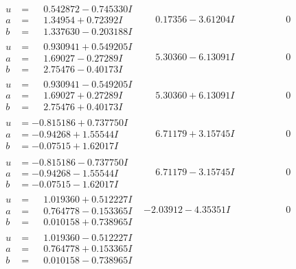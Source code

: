 \documentclass[1p]{elsarticle_modified}
\theoremstyle{definition}
\begin{document}
$$\begin{array}{c|c|c}
\begin{aligned}
u &= \phantom{-}0.542872 - 0.745330 I \\
a &= \phantom{-}1.34954 + 0.72392 I \\
b &= \phantom{-}1.337630 - 0.203188 I\end{aligned}
 & \phantom{-}0.17356 - 3.61204 I & \phantom{-0.000000 } 0 \\ \hline\begin{aligned}
u &= \phantom{-}0.930941 + 0.549205 I \\
a &= \phantom{-}1.69027 - 0.27289 I \\
b &= \phantom{-}2.75476 - 0.40173 I\end{aligned}
 & \phantom{-}5.30360 - 6.13091 I & \phantom{-0.000000 } 0 \\ \hline\begin{aligned}
u &= \phantom{-}0.930941 - 0.549205 I \\
a &= \phantom{-}1.69027 + 0.27289 I \\
b &= \phantom{-}2.75476 + 0.40173 I\end{aligned}
 & \phantom{-}5.30360 + 6.13091 I & \phantom{-0.000000 } 0 \\ \hline\begin{aligned}
u &= -0.815186 + 0.737750 I \\
a &= -0.94268 + 1.55544 I \\
b &= -0.07515 + 1.62017 I\end{aligned}
 & \phantom{-}6.71179 + 3.15745 I & \phantom{-0.000000 } 0 \\ \hline\begin{aligned}
u &= -0.815186 - 0.737750 I \\
a &= -0.94268 - 1.55544 I \\
b &= -0.07515 - 1.62017 I\end{aligned}
 & \phantom{-}6.71179 - 3.15745 I & \phantom{-0.000000 } 0 \\ \hline\begin{aligned}
u &= \phantom{-}1.019360 + 0.512227 I \\
a &= \phantom{-}0.764778 - 0.153365 I \\
b &= \phantom{-}0.010158 + 0.738965 I\end{aligned}
 & -2.03912 - 4.35351 I & \phantom{-0.000000 } 0 \\ \hline\begin{aligned}
u &= \phantom{-}1.019360 - 0.512227 I \\
a &= \phantom{-}0.764778 + 0.153365 I \\
b &= \phantom{-}0.010158 - 0.738965 I\end{aligned}

\end{array}$$
\end{document}
